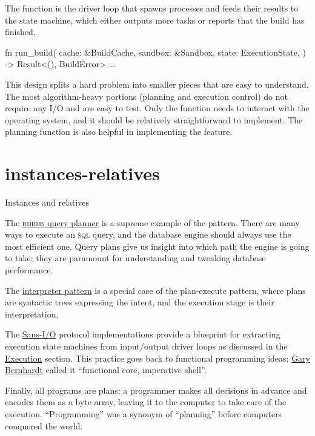 \documentclass{article}
\begin{document}
The  function is the driver loop that spawns processes and feeds their results to the state machine, which either outputs more tasks or reports that the build has finished.

\begin{code}[rust]
fn run_build(
    cache: &BuildCache,
    sandbox: &Sandbox,
    state: ExecutionState,
) -> Result<(), BuildError> { \ldots  }
\end{code}

This design splits a hard problem into smaller pieces that are easy to understand.
The most algorithm-heavy portions (planning and execution control) do not require any I/O and are easy to test.
Only the  function needs to interact with the operating system, and it should be relatively straightforward to implement.
The planning function is also helpful in implementing the  feature.

\section{instances-relatives}{Instances and relatives}

The \href{https://en.wikipedia.org/wiki/Query_plan}{\textsc{rdbms} query planner} is a supreme example of the pattern.
There are many ways to execute an \textsc{sql} query, and the database engine should always use the most efficient one.
Query plans give us insight into which path the engine is going to take; they are paramount for understanding and tweaking database performance.

The \href{https://en.wikipedia.org/wiki/Interpreter_pattern}{interpreter pattern} is a special case of the plan-execute pattern,
where plans are syntactic trees expressing the intent,
and the execution stage is their interpretation.

The \href{https://sans-io.readthedocs.io/how-to-sans-io.html}{Sans-I/O} protocol implementations provide a blueprint for extracting execution state machines from input/output driver loops
as discussed in the \href{#execution}{Execution} section.
This practice goes back to functional programming ideas;
\href{https://www.destroyallsoftware.com/talks/boundaries}{Gary Bernhardt} called it ``functional core, imperative shell''.

Finally, all programs are plans: a programmer makes all decisions in advance and encodes them as a byte array,
leaving it to the computer to take care of the execution.
``Programming'' was a synonym of ``planning'' before computers conquered the world.
\end{document}
